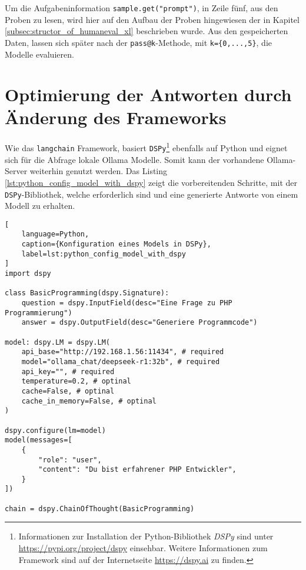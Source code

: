 Um die Aufgabeninformation \texttt{sample.get("prompt")}, in Zeile fünf, aus den Proben zu lesen, wird hier auf den Aufbau der Proben hingewiesen der in Kapitel \ref{subsec:structor_of_humaneval_xl} beschrieben wurde. Aus den gespeicherten Daten, lassen sich später nach der \texttt{pass@k}-Methode, mit \texttt{k=\{0,...,5\}}, die Modelle evaluieren.



\section{Optimierung der Antworten durch Änderung des Frameworks}
Wie das \texttt{langchain} Framework, basiert \texttt{DSPy}\footnote{Informationen zur Installation der Python-Bibliothek \textit{DSPy} sind unter \href{https://pypi.org/project/dspy/}{https://pypi.org/project/dspy} einsehbar. Weitere Informationen zum Framework sind auf der Internetseite \href{https://dspy.ai/}{https://dspy.ai} zu finden.} ebenfalls auf Python und eignet sich für die Abfrage lokale Ollama Modelle. Somit kann der vorhandene Ollama-Server weiterhin genutzt werden. Das Listing \ref{lst:python_config_model_with_dspy} zeigt die vorbereitenden Schritte, mit der \texttt{DSPy}-Bibliothek, welche erforderlich sind und eine generierte Antworte von einem Modell zu erhalten.\vspace{0.2cm}

\begin{lstlisting}[
	language=Python,
	caption={Konfiguration eines Models in DSPy},
	label=lst:python_config_model_with_dspy
]
import dspy

class BasicProgramming(dspy.Signature):
    question = dspy.InputField(desc="Eine Frage zu PHP Programmierung")
    answer = dspy.OutputField(desc="Generiere Programmcode")

model: dspy.LM = dspy.LM(
    api_base="http://192.168.1.56:11434", # required
    model="ollama_chat/deepseek-r1:32b", # required
    api_key="", # required
    temperature=0.2, # optinal
    cache=False, # optinal
    cache_in_memory=False, # optinal
)

dspy.configure(lm=model)
model(messages=[
    {
        "role": "user",
        "content": "Du bist erfahrener PHP Entwickler",
    }
])

chain = dspy.ChainOfThought(BasicProgramming)
\end{lstlisting}

